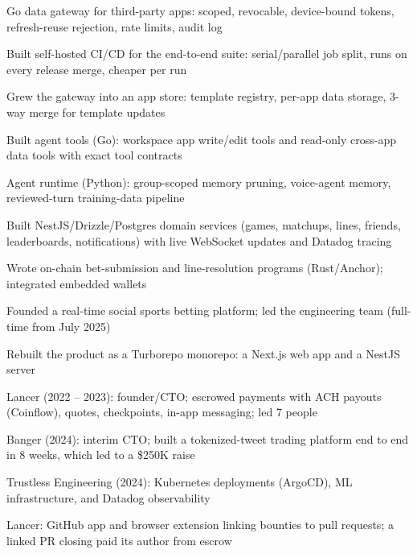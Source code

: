 \documentclass[print]{jack-resume}
\begin{document}
\begin{tightemize}
    \item Go data gateway for third-party apps: scoped, revocable, device-bound tokens, refresh-reuse rejection, rate limits, audit log
    \item Built self-hosted CI/CD for the end-to-end suite: serial/parallel job split, runs on every release merge, cheaper per run
    \item Grew the gateway into an app store: template registry, per-app data storage, 3-way merge for template updates
    \item Built agent tools (Go): workspace app write/edit tools and read-only cross-app data tools with exact tool contracts
    \item Agent runtime (Python): group-scoped memory pruning, voice-agent memory, reviewed-turn training-data pipeline
\end{tightemize}
\sectionsep

\begin{tightemize}
    \item Built NestJS/Drizzle/Postgres domain services (games, matchups, lines, friends, leaderboards, notifications) with live WebSocket updates and Datadog tracing
    \item Wrote on-chain bet-submission and line-resolution programs (Rust/Anchor); integrated embedded wallets
    \item Founded a real-time social sports betting platform; led the engineering team (full-time from July 2025)
    \item Rebuilt the product as a Turborepo monorepo: a Next.js web app and a NestJS server
\end{tightemize}
\sectionsep

\begin{tightemize}
    \item Lancer (2022 -- 2023): founder/CTO; escrowed payments with ACH payouts (Coinflow), quotes, checkpoints, in-app messaging; led 7 people
    \item Banger (2024): interim CTO; built a tokenized-tweet trading platform end to end in 8 weeks, which led to a \$250K raise
    \item Trustless Engineering (2024): Kubernetes deployments (ArgoCD), ML infrastructure, and Datadog observability
    \item Lancer: GitHub app and browser extension linking bounties to pull requests; a linked PR closing paid its author from escrow
\end{tightemize}
\sectionsep
\end{document}

